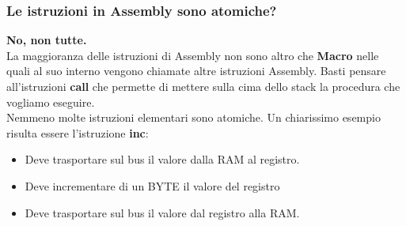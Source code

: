 \documentclass{article}
\begin{document}
        \newpage
        \subsubsection{Le istruzioni in Assembly sono atomiche?}
            \textbf{No, non tutte.}
            \\
            La maggioranza delle istruzioni di Assembly non sono altro che \textbf{Macro} nelle quali al suo interno vengono chiamate altre istruzioni Assembly.
            Basti pensare all'istruzioni \textbf{call} che permette di mettere sulla cima dello stack la procedura che vogliamo eseguire.
            \\
            Nemmeno molte istruzioni elementari sono atomiche.
            Un chiarissimo esempio risulta essere l'istruzione \textbf{inc}:
            \begin{itemize}
               \item Deve trasportare sul bus il valore dalla RAM al registro. 
               \item Deve incrementare di un BYTE il valore del registro
               \item Deve trasportare sul bus il valore dal registro alla RAM.
            \end{itemize}    
\end{document}
